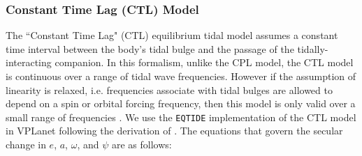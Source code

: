 \documentclass[twocolumn]{aastex61}
\newcommand{\eqtide}[0]{\texttt{EQTIDE}\xspace}
\begin{document}

\subsubsection{Constant Time Lag (CTL) Model}

The ``Constant Time Lag" (CTL) \citep[][]{Hut1981,Leconte2010} equilibrium tidal model assumes a constant time interval between the body's tidal bulge and the passage of the tidally-interacting companion. In this formalism, unlike the CPL model, the CTL model is continuous over a range of tidal wave frequencies.  However if the assumption of linearity is relaxed, i.e. frequencies associate with tidal bulges are allowed to depend on a spin or orbital forcing frequency, then this model is only valid over a small range of frequencies \citep{Greenberg2009}. We use the \eqtide implementation of the CTL model in VPLanet following the derivation of \citet{Leconte2010}.  The equations that govern the secular change in $e$, $a$, $\omega$, and $\psi$ are as follows:
\end{document}
